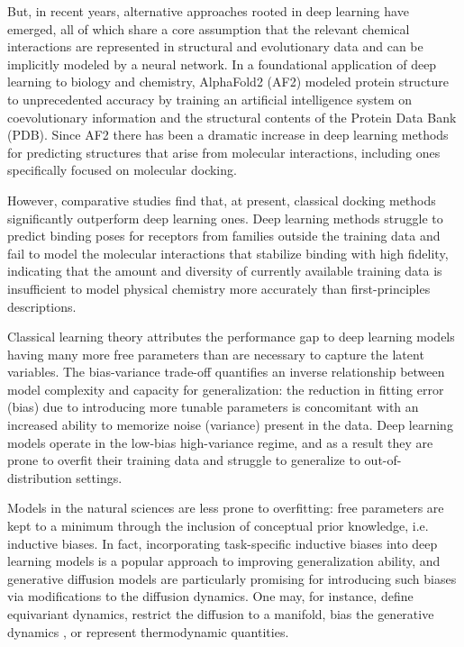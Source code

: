 \documentclass[letterpaper]{article}
\begin{document}
But, in recent years, alternative approaches rooted in deep learning have emerged, all of which share a core assumption that the relevant chemical interactions are represented in structural and evolutionary data and can be implicitly modeled by a neural network. In a foundational application of deep learning to biology and chemistry, AlphaFold2 (AF2) modeled protein structure to unprecedented accuracy by training an artificial intelligence system on coevolutionary information and the structural contents of the Protein Data Bank (PDB).\cite{jumper2021af2} Since AF2 there has been a dramatic increase in deep learning methods for predicting structures that arise from molecular interactions\cite{krishna2024rfaa,abramson2024af3}, including ones specifically focused on molecular docking. \cite{corso2022diffdock,qiao2024neuralplexer} 

However, comparative studies find that, at present, classical docking methods significantly outperform deep learning ones.\cite{buttenschoen2024posebusters} Deep learning methods struggle to predict binding poses for receptors from families outside the training data\cite{buttenschoen2024posebusters} and fail to model the molecular interactions that stabilize binding with high fidelity\cite{errington2024plif}, indicating that the amount and diversity of currently available training data is insufficient to model physical chemistry more accurately than first-principles descriptions.

Classical learning theory attributes the performance gap to deep learning models having many more free parameters than are necessary to capture the latent variables. The bias-variance trade-off quantifies an inverse relationship between model complexity and capacity for generalization: the reduction in fitting error (bias) due to introducing more tunable parameters  is concomitant with an increased ability to memorize noise (variance) present in the data.\cite{geman1992neural} Deep learning models operate in the low-bias high-variance regime, and as a result they are prone to overfit their training data and struggle to generalize to out-of-distribution settings.\cite{yoon2023diffusion}

Models in the natural sciences are less prone to overfitting: free parameters are kept to a minimum through the inclusion of conceptual prior knowledge, i.e. inductive biases.\cite{mitchell1980need} In fact, incorporating task-specific inductive biases into deep learning models is a popular approach to improving generalization ability\cite{fuchs2020equivariance,musaelian2023allegro}, and generative diffusion models are particularly promising for introducing such biases via modifications to the diffusion dynamics. One may, for instance, define equivariant dynamics\cite{hoogeboom2022equivariant}, restrict the diffusion to a manifold\cite{jing2022torsional,de2022riemannian}, bias the generative dynamics \cite{corso2023particle}, or represent thermodynamic quantities.\cite{herron2024inferring,exptm}
\end{document}
